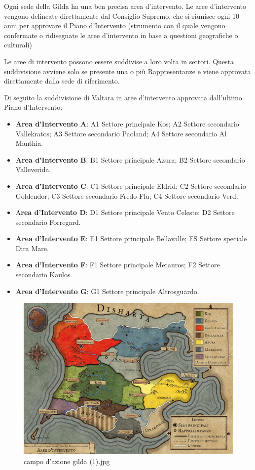 Ogni sede della Gilda ha una ben precisa area d'intervento. Le aree
d'intervento vengono delineate direttamente dal Consiglio Supremo, che
si riunisce ogni 10 anni per approvare il Piano d'Intervento (strumento
con il quale vengono confermate o ridisegnate le aree d'intervento in
base a questioni geografiche o culturali)

Le aree di intervento possono essere suddivise a loro volta in settori.
Questa suddivisione avviene solo se presente una o più Rappresentanze e
viene approvata direttamente dalla sede di riferimento.

Di seguito la suddivisione di Valtara in aree d'intervento approvata
dall'ultimo Piano d'Intervento:

\begin{itemize}
\tightlist
\item
  \textbf{Area d'Intervento A}: A1 Settore principale Kos; A2 Settore
  secondario Vallekratos; A3 Settore secondario Paoland; A4 Settore
  secondario Al Manthia.
\item
  \textbf{Area d'Intervento B}: B1 Settore principale Azura; B2 Settore
  secondario Valleverida.
\item
  \textbf{Area d'Intervento C}: C1 Settore principale Eldrid; C2 Settore
  secondario Goldendor; C3 Settore secondario Fredo Flu; C4 Settore
  secondario Verd.
\item
  A\textbf{rea d'Intervento D}: D1 Settore principale Vento Celeste; D2
  Settore secondario Forregard.
\item
  \textbf{Area d'Intervento E}: E1 Settore principale Bellavalle; ES
  Settore speciale Dira Mare.
\item
  \textbf{Area d'Intervento F}: F1 Settore principale Metauros; F2
  Settore secondario Kaulos.
\item
  \textbf{Area d'Intervento G}: G1 Settore principale Altrosguardo.
\end{itemize}

\begin{figure}
\centering
\includegraphics{campo_dazione_gilda_(1).jpg}
\caption{campo d'azione gilda (1).jpg}
\end{figure}

